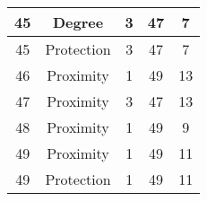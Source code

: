 \documentclass[results.tex]{subfiles}
\begin{document}
\begin{center}
\begin{tabular}{| c || c | c | c | c |}
            \hline
            45                      & Degree                       & 3                      & 47                      & 7                    \\
            \hline
            45                      & Protection                   & 3                      & 47                      & 7                    \\
            \hline
            46                      & Proximity                    & 1                      & 49                      & 13                   \\
            \hline
            47                      & Proximity                    & 3                      & 47                      & 13                   \\
            \hline
            48                      & Proximity                    & 1                      & 49                      & 9                    \\
            \hline
            49                      & Proximity                    & 1                      & 49                      & 11                   \\
            \hline
            49                      & Protection                   & 1                      & 49                      & 11                   \\
            \hline
        \end{tabular}
    \end{center}
\end{document}
